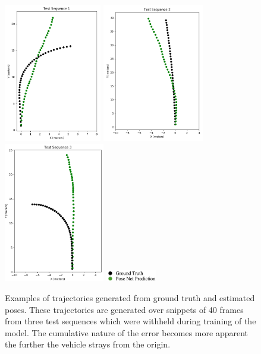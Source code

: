 \documentclass[openany]{book}
\begin{document}
\begin{figure}[htbp]
    \centering
    \includegraphics[height=2.4in]{images/vo_results/0034.png}
    \includegraphics[height=2.4in]{images/vo_results/0018.png}
    \includegraphics[height=2.4in]{images/vo_results/0027.png}
    \includegraphics[height=0.2in]{images/vo_results/legend.png}

    \caption{Examples of trajectories generated from ground truth and estimated poses. These trajectories are generated over snippets of 40 frames from three test sequences which were withheld during training of the model. The cumulative nature of the error becomes more apparent the further the vehicle strays from the origin.}

    \label{vo_results_kitti}
    
\end{figure}
\end{document}
